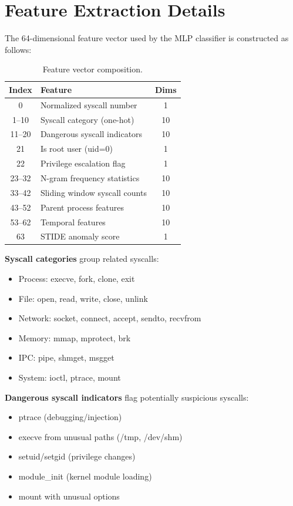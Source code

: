
\section{Feature Extraction Details}
\label{app:features}

The 64-dimensional feature vector used by the MLP classifier is constructed as follows:

\begin{table}[h]
\centering
\caption{Feature vector composition.}
\label{tab:features}
\begin{tabular}{clc}
\toprule
\textbf{Index} & \textbf{Feature} & \textbf{Dims} \\
\midrule
0 & Normalized syscall number & 1 \\
1--10 & Syscall category (one-hot) & 10 \\
11--20 & Dangerous syscall indicators & 10 \\
21 & Is root user (uid=0) & 1 \\
22 & Privilege escalation flag & 1 \\
23--32 & N-gram frequency statistics & 10 \\
33--42 & Sliding window syscall counts & 10 \\
43--52 & Parent process features & 10 \\
53--62 & Temporal features & 10 \\
63 & STIDE anomaly score & 1 \\
\bottomrule
\end{tabular}
\end{table}

\textbf{Syscall categories} group related syscalls:
\begin{itemize}
    \item Process: execve, fork, clone, exit
    \item File: open, read, write, close, unlink
    \item Network: socket, connect, accept, sendto, recvfrom
    \item Memory: mmap, mprotect, brk
    \item IPC: pipe, shmget, msgget
    \item System: ioctl, ptrace, mount
\end{itemize}

\textbf{Dangerous syscall indicators} flag potentially suspicious syscalls:
\begin{itemize}
    \item ptrace (debugging/injection)
    \item execve from unusual paths (/tmp, /dev/shm)
    \item setuid/setgid (privilege changes)
    \item module\_init (kernel module loading)
    \item mount with unusual options
\end{itemize}

